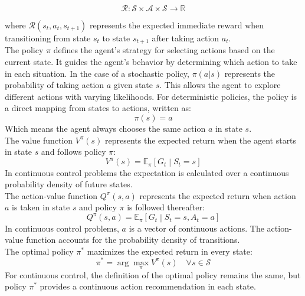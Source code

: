 \begin{equation}
\mathcal{R}: \mathcal{S} \times \mathcal{A} \times \mathcal{S} \rightarrow \mathbb{R}
\end{equation}

\noindent where \( \mathcal{R}(s_t, a_t, s_{t+1}) \) represents the expected immediate reward when transitioning from state \( s_t \) to state \( s_{t+1} \) after taking action \( a_t \).\\

\noindent The policy \( \pi \) defines the agent’s strategy for selecting actions based on the current state. It guides the agent’s behavior by determining which action to take in each situation. In the case of a stochastic policy, \( \pi(a|s) \) represents the probability of taking action \( a \) given state \( s \). This allows the agent to explore different actions with varying likelihoods. For deterministic policies, the policy is a direct mapping from states to actions, written as:
\begin{equation} \pi(s) = a \end{equation}
Which means the agent always chooses the same action \( a \) in state \( s \).\\

\noindent The value function $V^\pi(s)$ represents the expected return when the agent starts in state $s$ and follows policy $\pi$:
\begin{equation} V^\pi(s) = \mathbb{E}_{\pi}\left[G_t \middle| S_t = s\right] \end{equation}
In continuous control problems the expectation is calculated over a continuous probability density of future states.\\

\noindent The action-value function $Q^\pi(s,a)$ represents the expected return when action $a$ is taken in state $s$ and policy $\pi$ is followed thereafter:
\begin{equation} Q^\pi(s,a) = \mathbb{E}_{\pi}\left[G_t \middle| S_t = s, A_t = a\right] \end{equation}
In continuous control problems, $a$ is a vector of continuous actions. The action-value function accounts for the probability density of transitions.\\

\noindent The optimal policy $\pi^*$ maximizes the expected return in every state:
\begin{equation} \pi^* = \arg\max_\pi V^\pi(s) \quad \forall s \in \mathcal{S} \end{equation}
For continuous control, the definition of the optimal policy remains the same, but policy $\pi^*$ provides a continuous action recommendation in each state.

